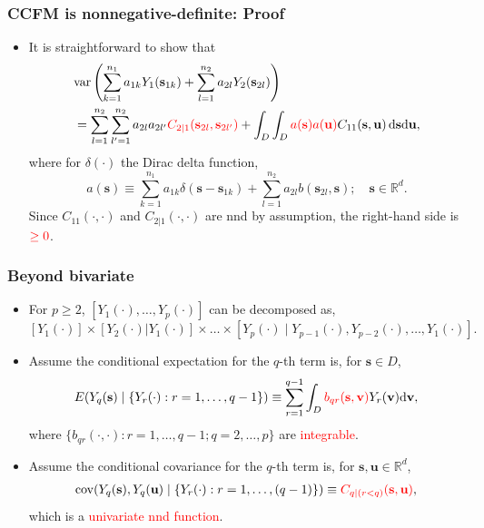 \documentclass{beamer}
\newcommand{\intd} {\mathrm{d}}
\newcommand{\svec} {\textbf{s}}
\newcommand{\uvec} {\textbf{u}}
\newcommand{\s}{\mathbf{s}}
\renewcommand{\v}{\mathbf{v}}
\renewcommand{\u}{\mathbf{u}}
\renewcommand{\d}{\mathrm{d}}
\newcommand{\E}{E}
\newcommand{\cov}{\mathrm{cov}}
\newcommand{\var}{\mathrm{var}}
\newcommand{\RR}{\mathbb{R}}
\newcommand{\red}{\textcolor{red}}%
\begin{document}

\begin{frame}
\frametitle{CCFM is nonnegative-definite: Proof}

\begin{itemize}
\item It is straightforward to show that
\begin{align*}
& \var\left(\sum_{k=1}^{n_1}{a_{1k}Y_1(\s_{1k})}+\sum_{l=1}^{n_2}{a_{2l}Y_2(\s_{2l})}\right)\\
&= \sum_{l=1}^{n_2}\sum_{l'=1}^{n_2}a_{2l}a_{2l'}\textcolor{red}{C_{2\mid 1}(\s_{2l},\s_{2l'})}+\int_D \int_D{\red{a(\s)a(\u)}}C_{11}(\s,\u)\,\d\s\d\u,
\end{align*}
where for $\delta(\cdot)$ the Dirac delta function,
\begin{equation*}
a(\s)\equiv \sum_{k=1}^{n_1}a_{1k}\delta(\s-\s_{1k})+\sum_{l=1}^{n_2}a_{2l}b(\s_{2l},\s);\quad \s\in \RR^d.
\end{equation*}
Since $C_{11}(\cdot,\cdot)$ and $C_{2|1}(\cdot,\cdot)$ are nnd by assumption, the right-hand side is $\textcolor{red}{\geq0}$.
\end{itemize}
\end{frame}


\begin{frame}
\frametitle{Beyond bivariate}

\begin{itemize}
\item For $p\geq2$, $[Y_1(\cdot),\dots,Y_p(\cdot)]$ can be decomposed as,
$$
[Y_1(\cdot)]\times[Y_2(\cdot)|Y_1(\cdot)]\times\ldots\times[Y_p(\cdot) \mid  Y_{p-1}(\cdot),Y_{p-2}(\cdot),\dots,Y_1(\cdot)].
$$ \pause
\vspace{-.6cm}
\item Assume the conditional expectation for the $q$-th term is, for $\s\in D$,
\begin{equation*}
\E(Y_q(\svec) \mid  \{Y_r(\cdot) : r = 1,\dots,q-1\}) \equiv \sum_{r = 1}^{q-1} \int_D \textcolor{red}{b_{qr}(\svec,\v)}Y_r(\v) \intd \v,
\end{equation*}
where $\{b_{qr}(\cdot,\cdot):r=1,\ldots,q-1;q=2,\ldots,p\}$ are \textcolor{red}{integrable}. \pause
\item Assume the conditional covariance for the $q$-th term is, for $\s,\u\in\mathbb{R}^d$,
\begin{align*}
\cov(Y_q(\svec), Y_q(\uvec) \mid  \{Y_r(\cdot) : r = 1,\dots,(q-1)\}) \equiv \textcolor{red}{C_{q \mid  (r < q)}(\svec,\uvec)}, 
\end{align*}
which is a \textcolor{red}{univariate nnd function}.
\end{itemize}
\end{frame}
\end{document}
